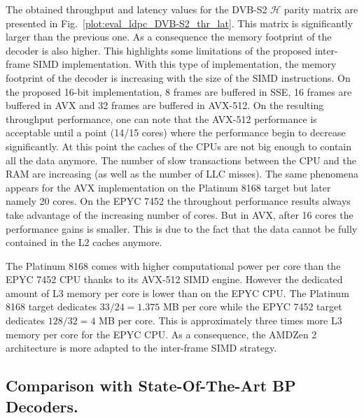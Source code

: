 The obtained throughput and latency values for the DVB-S2 $\mathcal{H}$ parity
matrix are presented in Fig.~\ref{plot:eval_ldpc_DVB-S2_thr_lat}. This matrix is
significantly larger than the previous one. As a consequence the memory
footprint of the decoder is also higher. This highlights some limitations of the
proposed inter-frame SIMD implementation. With this type of implementation, the
memory footprint of the decoder is increasing with the size of the SIMD
instructions. On the proposed 16-bit implementation, 8 frames are buffered in
SSE, 16 frames are buffered in AVX and 32 frames are buffered in AVX-512.
On the resulting throughput performance, one can note that the AVX-512
performance is acceptable until a point (14/15 cores) where the performance
begin to decrease significantly. At this point the caches of the CPUs are not
big enough to contain all the data anymore. The number of slow transactions
between the CPU and the RAM are increasing (as well as the number of LLC
misses). The same phenomena appears for the AVX implementation on the Platinum
8168 target but later namely 20 cores. On the EPYC 7452 the throughout
performance results always take advantage of the increasing number of cores. But
in AVX, after 16 cores the performance gains is smaller. This is due to the fact
that the data cannot be fully contained in the L2 caches anymore.

The Platinum 8168 comes with higher computational power per core than the EPYC
7452 CPU thanks to its AVX-512 SIMD engine. However the dedicated amount of L3
memory per core is lower than on the EPYC CPU. The Platinum 8168 target
dedicates $33 / 24 = 1.375$ MB per core while the EPYC 7452 target dedicates
$128 / 32 = 4$ MB per core. This is approximately three times more L3 memory
per core for the EPYC CPU. As a consequence, the AMD\R Zen 2 architecture is
more adapted to the inter-frame SIMD strategy.

\subsection{Comparison with State-Of-The-Art BP Decoders.}

